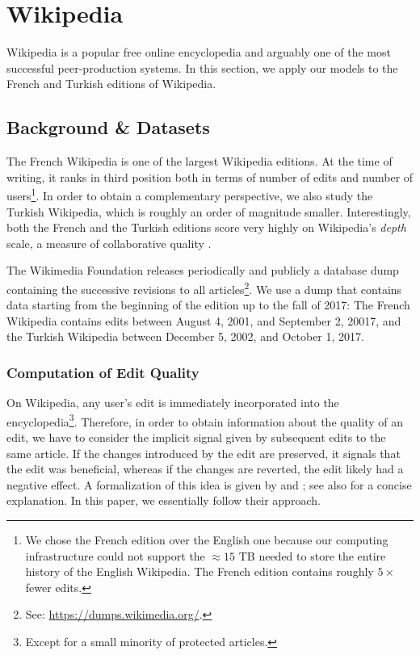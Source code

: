 \section{Wikipedia}
\label{pps:sec:wikipedia}

Wikipedia is a popular free online encyclopedia and arguably one of the most successful peer-production systems.
In this section, we apply our models to the French and Turkish editions of Wikipedia.

\subsection{Background \& Datasets}

The French Wikipedia is one of the largest Wikipedia editions.
At the time of writing, it ranks in third position both in terms of number of edits and number of users\footnote{%
	We chose the French edition over the English one because our computing infrastructure could not support the $\approx15$ TB needed to store the entire history of the English Wikipedia.
	The French edition contains roughly $5\times$ fewer edits.
}.
In order to obtain a complementary perspective, we also study the Turkish Wikipedia, which is roughly an order of magnitude smaller.
Interestingly, both the French and the Turkish editions score very highly on Wikipedia's \emph{depth} scale, a measure of collaborative quality \citep{wikimedia2017depth}.

The Wikimedia Foundation releases periodically and publicly a database dump containing the successive revisions to all articles\footnote{%
	See: \url{https://dumps.wikimedia.org/}.}.
We use a dump that contains data starting from the beginning of the edition up to the fall of 2017:
The French Wikipedia contains edits between August 4, 2001, and September 2, 20017, and the Turkish Wikipedia between December 5, 2002, and October 1, 2017.

\subsubsection{Computation of Edit Quality}

On Wikipedia, any user's edit is immediately incorporated into the encyclopedia\footnote{Except for a small minority of protected articles.}.
Therefore, in order to obtain information about the quality of an edit, we have to consider the implicit signal given by subsequent edits to the same article.
If the changes introduced by the edit are preserved, it signals that the edit was beneficial, whereas if the changes are reverted, the edit likely had a negative effect.
A formalization of this idea is given by \citet{adler2007content} and \citet{druck2008learning};
see also \citet{dealfaro2013content} for a concise explanation.
In this paper, we essentially follow their approach.

